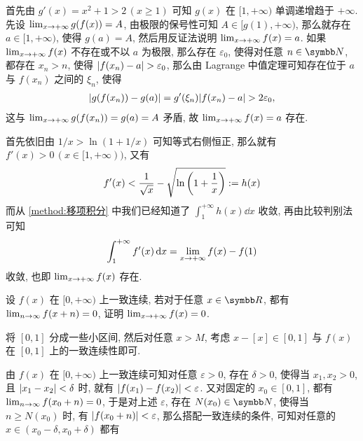 \begin{exercise}[series=exer]
\begin{answer}
\begin{method}
            首先由 $ g'(x) = x^{2} + 1 > 2\,(x \ge 1) $ 可知 $ g(x) $ 在 $ [1, +\infty) $ 单调递增趋于 $ +\infty $. 先设 $ \lim_{x \to +\infty} g(f(x)) = A $, 由极限的保号性可知 $ A \in [g(1), +\infty) $, 那么就存在 $ a \in [1, +\infty) $, 使得 $ g(a) = A $, 然后用反证法说明 $ \lim_{x \to +\infty} f(x) = a $. 如果 $ \lim_{x \to +\infty}f(x) $ 不存在或不以 $ a $ 为极限, 那么存在 $ \varepsilon_{0} $, 使得对任意 $ n \in \N $, 都存在 $ x_{n} > n $, 使得 $ \abs{f(x_{n}) - a} > \varepsilon_{0} $, 那么由 Lagrange 中值定理可知存在位于 $ a $ 与 $ f(x_{n}) $ 之间的 $ \xi_{n} $, 使得
            \begin{align*}
                \abs{g(f(x_{n})) - g(a)} = g'(\xi_{n})\abs{f(x_{n}) - a} > 2\varepsilon_{0},
            \end{align*}
            这与 $ \lim_{x \to +\infty}g(f(x_{n})) = g(a) = A $ 矛盾, 故 $ \lim_{x \to +\infty} f(x) = a $ 存在.
            \item 首先依旧由 $ 1/x > \ln (1 + 1/x) $ 可知等式右侧恒正, 那么就有 $ f'(x) > 0\,(x \in [1, +\infty)) $, 又有
            \begin{align*}
                f'(x) < \frac{1}{\sqrt{x}} - \sqrt{\ln\qty(1 + \frac{1}{x})} := h(x)
            \end{align*}
            而从 \ref{method:移项积分} 中我们已经知道了 $ \int_{1}^{+\infty} h(x) \dd{x} $ 收敛, 再由比较判别法可知
            \begin{align*}
                \int_{1}^{+\infty} f'(x) \dd{x} = \lim_{x \to +\infty}f(x) - f(1)
            \end{align*} 
            收敛, 也即 $ \lim_{x \to +\infty} f(x) $ 存在.
        \end{method}
    \end{answer}
    \item\label{item:fx+n} 设 $ f(x) $ 在 $ [0, +\infty) $ 上一致连续, 若对于任意 $ x \in \R $, 都有 $ \lim_{n \to \infty} f(x + n) = 0 $, 证明 $ \lim_{x \to +\infty} f(x) = 0 $.  
    \begin{hint}
        将 $ [0, 1] $ 分成一些小区间, 然后对任意 $ x > M $, 考虑 $ x - [x] \in [0, 1] $ 与 $ f(x) $ 在 $ [0, 1] $ 上的一致连续性即可. 
    \end{hint}
    \begin{answer}
        由 $ f(x) $ 在 $ [0, +\infty) $ 上一致连续可知对任意 $ \varepsilon > 0 $, 存在 $ \delta > 0 $, 使得当 $ x_{1}, x_{2} > 0 $, 且 $ \abs{x_{1} - x_{2}} < \delta $ 时, 就有 $ \abs{f(x_{1}) - f(x_{2})} < \varepsilon $. 又对固定的 $ x_{0} \in [0, 1] $, 都有 $ \lim_{n \to \infty} f(x_{0} + n) = 0 $, 于是对上述 $ \varepsilon $, 存在 $ N(x_{0}) \in \N $, 使得当 $ n \ge N(x_{0}) $ 时, 有 $ \abs{f(x_{0} + n)} < \varepsilon $, 那么搭配一致连续的条件, 可知对任意的 $ x \in (x_{0} - \delta, x_{0} + \delta) $ 都有

\end{answer}
\end{exercise}
